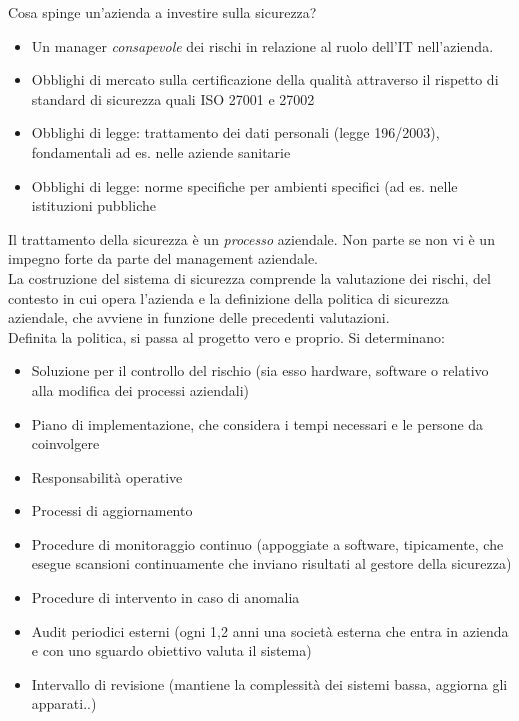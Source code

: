 Cosa spinge un'azienda a investire sulla sicurezza?

\begin{itemize}

\item
  Un manager \emph{consapevole} dei rischi in relazione al ruolo dell'IT
  nell'azienda.\\
\item
  Obblighi di mercato sulla certificazione della qualit\`a attraverso il
  rispetto di standard di sicurezza quali ISO 27001 e 27002
\item
  Obblighi di legge: trattamento dei dati personali (legge 196/2003),
  fondamentali ad es. nelle aziende sanitarie
\item
  Obblighi di legge: norme specifiche per ambienti specifici (ad es.
  nelle istituzioni pubbliche
\end{itemize}
Il trattamento della sicurezza \`e un \emph{processo} aziendale. Non parte
se non vi \`e un impegno forte da parte del management aziendale.\\
La costruzione del sistema di sicurezza comprende la valutazione dei
rischi, del contesto in cui opera l'azienda e la definizione della
politica di sicurezza aziendale, che avviene in funzione delle
precedenti valutazioni.\\
Definita la politica, si passa al progetto vero e proprio. Si
determinano:

\begin{itemize}

\item
  Soluzione per il controllo del rischio (sia esso hardware, software o relativo alla modifica dei processi aziendali)
\item
  Piano di implementazione, che considera i tempi necessari e le persone da coinvolgere
\item
  Responsabilit\`a operative
\item
  Processi di aggiornamento
\item
  Procedure di monitoraggio continuo (appoggiate a software, tipicamente, che
  esegue scansioni continuamente che inviano risultati al gestore della
  sicurezza)
\item
  Procedure di intervento in caso di anomalia
\item
  Audit periodici esterni (ogni 1,2 anni una societ\`a esterna che entra
  in azienda e con uno sguardo obiettivo valuta il sistema)
\item
  Intervallo di revisione (mantiene la complessit\`a dei sistemi bassa,
  aggiorna gli apparati..)
\end{itemize}

